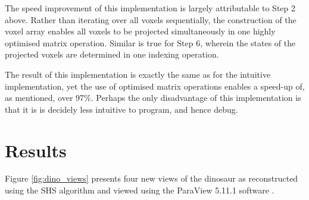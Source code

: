 The speed improvement of this implementation is largely attributable to Step 2 above. Rather than iterating over all voxels sequentially, the construction of the voxel array enables all voxels to be projected simultaneously in one highly optimised matrix operation. Similar is true for Step 6, wherein the states of the projected voxels are determined in one indexing operation.

The result of this implementation is exactly the same as for the intuitive implementation, yet the use of optimised matrix operations enables a speed-up of, as mentioned, over 97\%. Perhaps the only disadvantage of this implementation is that it is is decidely less intuitive to program, and hence debug.

\newpage
\section{Results}

Figure \ref{fig:dino_views} presents four new views of the dinosaur as reconstructed using the SHS algorithm and viewed using the ParaView 5.11.1 software \cite{kitware_2023}.

